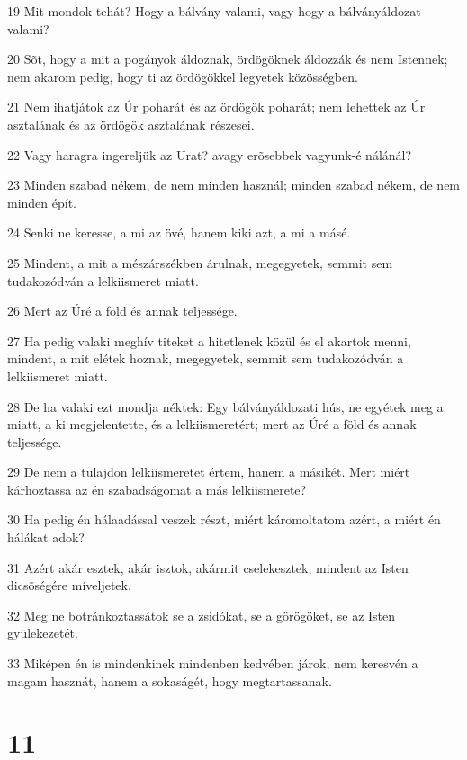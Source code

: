 \par 19 Mit mondok tehát? Hogy a bálvány valami, vagy hogy a bálványáldozat valami?
\par 20 Sõt, hogy a mit a pogányok áldoznak, ördögöknek áldozzák és nem Istennek; nem akarom pedig, hogy ti az ördögökkel legyetek közösségben.
\par 21 Nem ihatjátok az Úr poharát és az ördögök poharát; nem lehettek az Úr asztalának és az ördögök asztalának részesei.
\par 22 Vagy haragra ingereljük az Urat? avagy erõsebbek vagyunk-é nálánál?
\par 23 Minden szabad nékem, de nem minden használ; minden szabad nékem, de nem minden épít.
\par 24 Senki ne keresse, a mi az övé, hanem kiki azt, a mi a másé.
\par 25 Mindent, a mit a mészárszékben árulnak, megegyetek, semmit sem tudakozódván a lelkiismeret miatt.
\par 26 Mert az Úré a föld és annak teljessége.
\par 27 Ha pedig valaki meghív titeket a hitetlenek közül és el akartok menni, mindent, a mit elétek hoznak, megegyetek, semmit sem tudakozódván a lelkiismeret miatt.
\par 28 De ha valaki ezt mondja néktek: Egy bálványáldozati hús, ne egyétek meg a miatt, a ki megjelentette, és a lelkiismeretért; mert az Úré a föld és annak teljessége.
\par 29 De nem a tulajdon lelkiismeretet értem, hanem a másikét. Mert miért kárhoztassa az én szabadságomat a más lelkiismerete?
\par 30 Ha pedig én hálaadással veszek részt, miért káromoltatom azért, a miért én hálákat adok?
\par 31 Azért akár esztek, akár isztok, akármit cselekesztek, mindent az Isten dicsõségére míveljetek.
\par 32 Meg ne botránkoztassátok se a zsidókat, se a görögöket, se az Isten gyülekezetét.
\par 33 Miképen én is mindenkinek mindenben kedvében járok, nem keresvén a magam hasznát, hanem a sokaságét, hogy megtartassanak.

\chapter{11}

